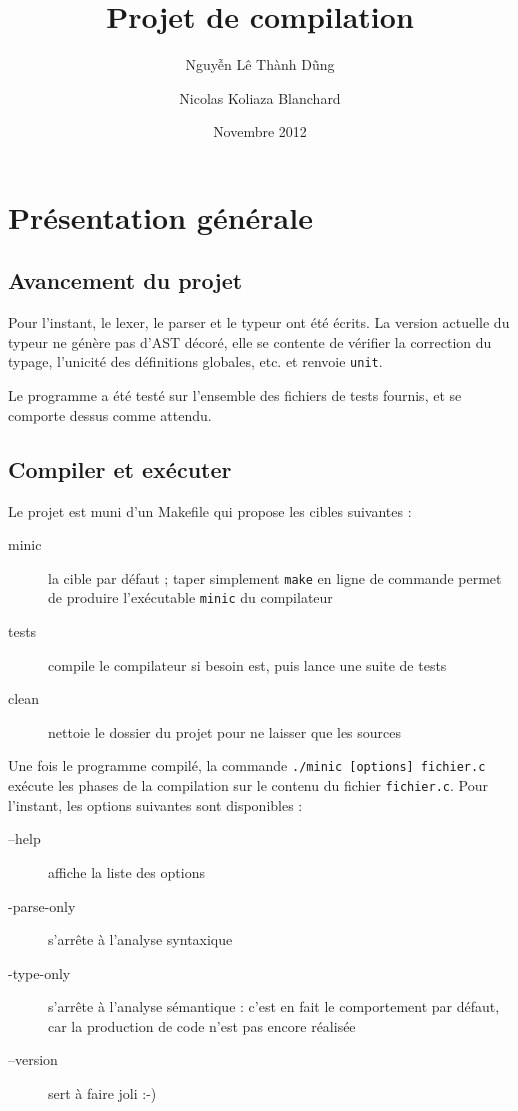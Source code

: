 \documentclass[a4paper, 11pt]{article}
\begin{document}
 
\title{Projet de compilation}
\author{Nguy\~{\^e}n Lê Thành D\~ung \and Nicolas Koliaza Blanchard}
\date{Novembre 2012}
\maketitle

\section{Présentation générale}

\subsection{Avancement du projet}

Pour l'instant, le lexer, le parser et le typeur ont été écrits. La version
actuelle du typeur ne génère pas d'AST décoré, elle se contente de vérifier
la correction du typage, l'unicité des définitions globales, etc. et renvoie
\texttt{unit}.

Le programme a été testé sur l'ensemble des fichiers de tests fournis, et
se comporte dessus comme attendu.

\subsection{Compiler et exécuter}

Le projet est muni d'un Makefile qui propose les cibles suivantes :
\begin{description}
\item[minic] la cible par défaut ; taper simplement \texttt{make} en ligne
  de commande permet de produire l'exécutable \texttt{minic} du compilateur
\item[tests] compile le compilateur si besoin est, puis lance une suite de tests
\item[clean] nettoie le dossier du projet pour ne laisser que les sources
\end{description}

Une fois le programme compilé, la commande \texttt{./minic [options] fichier.c}
exécute les phases de la compilation sur le contenu du fichier \texttt{fichier.c}.
Pour l'instant, les options suivantes sont disponibles :
\begin{description}
\item[--help] affiche la liste des options
\item[-parse-only] s'arrête à l'analyse syntaxique
\item[-type-only] s'arrête à l'analyse sémantique : c'est en fait le comportement
  par défaut, car la production de code n'est pas encore réalisée
\item[--version] sert à faire joli :-)
\end{description}
\end{document}
